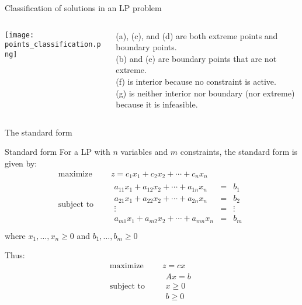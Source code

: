 \documentclass[c]{beamer}
\begin{document}
\begin{frame}{Classification of solutions in an LP problem}
  \begin{columns}[T]
    \begin{column}{.45\textwidth}
      \begin{center}
        \texttt{[image: points\_classification.png]}
      \end{center}
    \end{column}
    \begin{column}{.45\textwidth}
      (a), (c), and (d) are both extreme points and boundary points. \\
      (b) and (e) are boundary points that are not extreme. \\
      (f) is interior because no constraint is active. \\
      (g) is neither interior nor boundary (nor extreme) because it is infeasible.\cite{rardin}
    \end{column}
  \end{columns}
\end{frame}


\begin{frame}{The standard form}

  \begin{block}{Standard form}
    For a LP with $n$ variables and $m$ constraints, the standard form is given by:
    \begin{equation*}
      \begin{aligned}
        \text{maximize } \quad & z = c_1x_1+c_2x_2 +\cdots + c_nx_n \\
        \text{subject to }\quad &
        \begin{array}{rcl}
          a_{11}x_1+a_{12}x_2+\cdots+a_{1n}x_n &= &b_1 \\
          a_{21}x_1+a_{22}x_2+\cdots+a_{2n}x_n &= &b_2 \\
          \vdots &=& \vdots\\
          a_{m1}x_1+a_{m2}x_2+\cdots+a_{mn}x_n &= &b_m \\
        \end{array}
      \end{aligned}
    \end{equation*}
    where $x_1,\ldots,x_n\geq0$ and $b_1,\ldots,b_m\geq0$
  \end{block}

Thus:
\begin{equation*}
  \begin{aligned}
    \text{maximize } \quad & z = cx \\
    \text{subject to }\quad &
    \begin{array}{c}
      Ax=b\\
      x\geq0\\
      b\geq0
    \end{array}
  \end{aligned}
\end{equation*}

\end{frame}
\end{document}

